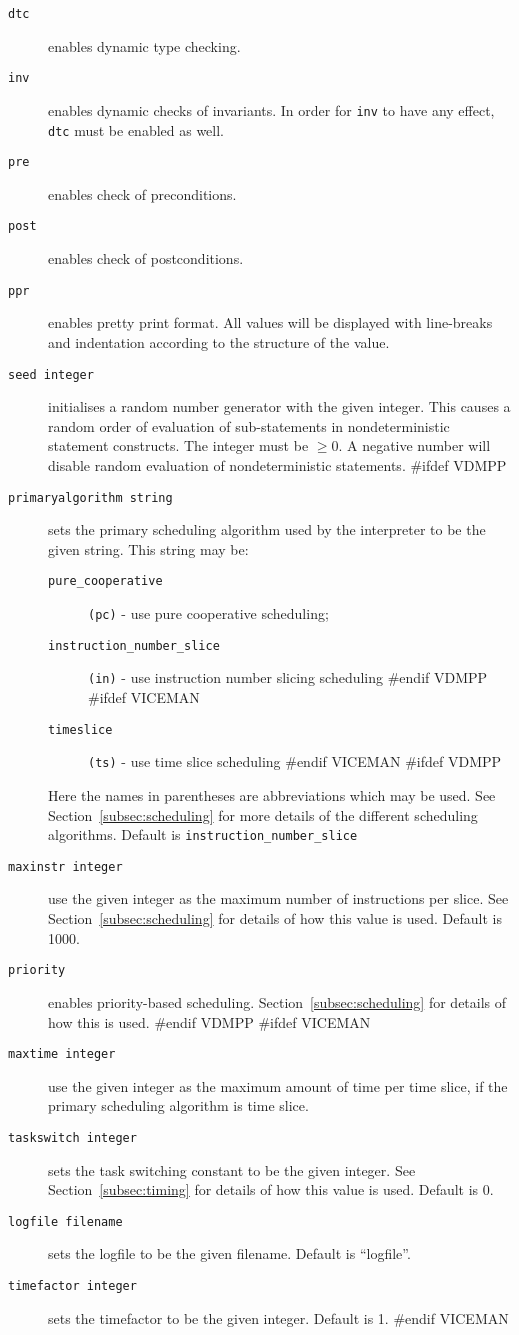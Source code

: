 \documentclass[\pformat,12pt]{article}
\begin{document}
\begin{description}
  \begin{description}
  \item[{\tt dtc}] enables dynamic type checking.
  \item[{\tt inv}] enables dynamic checks of invariants. In order for
    {\tt inv} to have any effect, {\tt dtc} must be enabled as well.
  \item[{\tt pre}] enables check of preconditions.
  \item[{\tt post}] enables check of postconditions.
  \item[{\tt ppr}] enables pretty print format. All values will be
    displayed with line-breaks and indentation according to the
    structure of the value.
  \item[{\tt seed integer}] initialises a random number generator with
    the given integer.  This causes a random order of evaluation of
    sub-statements in nondeterministic statement constructs.  The
    integer must be $\geq 0$. A negative number will disable random
    evaluation of nondeterministic statements.
#ifdef VDMPP
  \item[{\tt primaryalgorithm string}] sets the primary scheduling
    algorithm used by the interpreter to be the given string. This
    string may be:
    \begin{description}
    \item[{\tt pure\_cooperative}] \texttt{(pc)} - use pure
      cooperative scheduling;
    \item[{\tt instruction\_number\_slice}] \texttt{(in)} - use
      instruction number slicing scheduling
#endif VDMPP
#ifdef VICEMAN
    \item[{\tt timeslice}] \texttt{(ts)} - use time slice scheduling 
#endif VICEMAN
#ifdef VDMPP
    \end{description}
    Here the names in parentheses are abbreviations which may be
    used. See Section~\ref{subsec:scheduling} for more details of the
    different scheduling algorithms. Default is 
    {\tt instruction\_number\_slice}
  \item[{\tt maxinstr integer}] use the given integer as the maximum
    number of instructions per slice. See
    Section~\ref{subsec:scheduling} for details of how this value is
    used. Default is 1000.
  \item[{\tt priority}] enables priority-based scheduling.
    Section~\ref{subsec:scheduling} for details of how this is
    used. 
#endif VDMPP
#ifdef VICEMAN
  \item[{\tt maxtime integer}] use the given integer as the maximum
    amount of time per time slice, if the primary scheduling algorithm
    is time slice.
  \item[{\tt taskswitch integer}] sets the task switching constant to
    be the given integer. See Section~\ref{subsec:timing} for details
    of how this value is used. Default is 0.
  \item[{\tt logfile filename}] sets the logfile to be the given
    filename. Default is ``logfile''.
  \item[{\tt timefactor integer}] sets the timefactor to be the given
    integer. Default is 1.
#endif VICEMAN
  \end{description}
  

\end{description}
\end{document}
